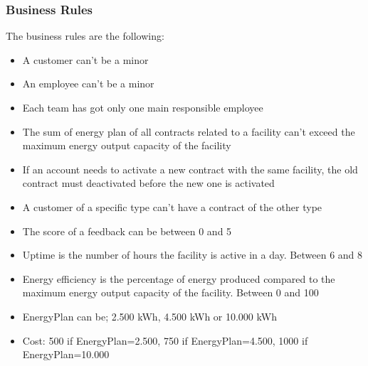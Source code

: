 \subsubsection{Business Rules}
The business rules are the following:
\begin{itemize}
    \item A customer can't be a minor
    \item An employee can't be a minor
    \item Each team has got only one main responsible employee
    \item The sum of energy plan of all contracts related to a facility can't exceed the maximum energy output capacity of the facility
    \item If an account needs to activate a new contract with the same facility, the old contract must deactivated before the new one is activated
    \item A customer of a specific type can't have a contract of the other type
    \item The score of a feedback can be between 0 and 5
    \item Uptime is the number of hours the facility is active in a day. Between 6 and 8
    \item Energy efficiency is the percentage of energy produced compared to the maximum energy output capacity of the facility. Between 0 and 100
    \item EnergyPlan can be; 2.500 kWh, 4.500 kWh or 10.000 kWh
    \item Cost: 500 if EnergyPlan=2.500, 750 if EnergyPlan=4.500, 1000 if EnergyPlan=10.000
\end{itemize}




